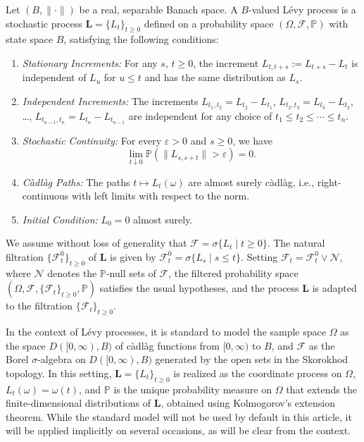 \documentclass[11pt]{amsart}
\theoremstyle{definition}
\theoremstyle{remark}
\numberwithin{equation}{section}
\begin{document}
Let \((B, \|\cdot\|)\) be a real, separable Banach space. A \(B\)-valued L\'evy process is a stochastic process \(\bm{L} = \{L_t\}_{t \geq 0}\) defined on a probability space \((\Omega, \mathcal{F}, \mathbb{P})\) with state space \(B\), satisfying the following conditions:
\begin{enumerate}
    \item  \textit{Stationary Increments:} For any \(s,\,t \geq 0\), the increment \(L_{t,t+s} := L_{t+s} - L_t\) is independent of \(L_u\) for \(u \leq t\) and has the same distribution as \(L_s\).
    \item  \textit{Independent Increments:} The increments \(L_{t_1, t_2} = L_{t_2} - L_{t_1}\), \(L_{t_2, t_3} = L_{t_3} - L_{t_2}\), \ldots, \(L_{t_{n-1}, t_n} = L_{t_n} - L_{t_{n-1}}\) are independent for any choice of \(t_1 \leq t_2 \leq \cdots \leq t_n\).
    \item \textit{Stochastic Continuity:} For every \(\varepsilon > 0\) and \(s \geq 0\), we have
    \[
    \lim_{t \downarrow 0} \mathbb{P}(\|L_{s, s+t}\| > \varepsilon) = 0.
    \]
    \item \textit{C\`adl\`ag Paths:} The paths \(t \mapsto L_t(\omega)\) are almost surely c\`adl\`ag, i.e., right-continuous with left limits with respect to the norm.
    \item \textit{Initial Condition:} \(L_0 = 0\) almost surely.
\end{enumerate}

We assume without loss of generality that \(\mathcal{F} = \sigma\{L_t \mid t \geq 0\}\). The natural filtration \(\{\mathcal{F}_t^0\}_{t \geq 0}\) of \(\bm{L}\) is given by \(\mathcal{F}_t^0 = \sigma\{L_s \mid s \leq t\}\). Setting \(\mathcal{F}_t = \mathcal{F}_t^0 \vee \mathcal{N}\), where \(\mathcal{N}\) denotes the \(\mathbb{P}\)-null sets of \(\mathcal{F}\), the filtered probability space \((\Omega, \mathcal{F}, \{\mathcal{F}_t\}_{t \geq 0}, \mathbb{P})\) satisfies the usual hypotheses, and the process \(\bm{L}\) is adapted to the filtration \(\{\mathcal{F}_t\}_{t \geq 0}\).

In the context of L\'evy processes, it is standard to model the sample space \(\Omega\) as the space \(D([0, \infty), B)\) of c\`adl\`ag functions from \([0,\infty)\) to \(B\), and \(\mathcal{F}\) as the Borel \(\sigma\)-algebra on \(D([0, \infty), B)\) generated by the open sets in the Skorokhod topology. In this setting, \(\bm{L} = \{L_t\}_{t \geq 0}\) is realized as the coordinate process on \(\Omega\), \(L_t(\omega) = \omega(t)\), and \(\mathbb{P}\) is the unique probability measure on \(\Omega\) that extends the finite-dimensional distributions of \(\bm{L}\), obtained using Kolmogorov's extension theorem. While the standard model will not be used by default in this article, it will be applied implicitly on several occasions, as will be clear from the context.
\end{document}
